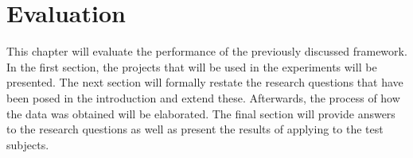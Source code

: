 
\chapter{Evaluation}\label{chap:evaluation}
This chapter will evaluate the performance of the previously discussed \velocity{} framework. In the first section, the projects that will be used in the experiments will be presented. The next section will formally restate the research questions that have been posed in the introduction and extend these. Afterwards, the process of how the data was obtained will be elaborated. The final section will provide answers to the research questions as well as present the results of applying \tcp{} to the test subjects.




